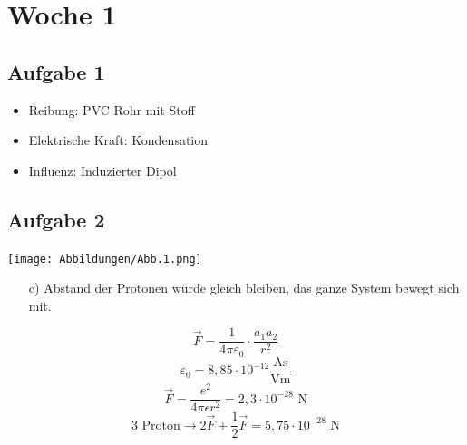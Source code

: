 \documentclass{article}
\begin{document}
\section*{Woche 1}
\subsection*{Aufgabe 1}
\begin{itemize}
    \item Reibung: PVC Rohr mit Stoff
    \item Elektrische Kraft: Kondensation
    \item Influenz: Induzierter Dipol
\end{itemize}
\subsection*{Aufgabe 2}
\begin{center}
    \texttt{[image: Abbildungen/Abb.1.png]}
\end{center}
\begin{itemize}
    \item[c)] Abstand der Protonen würde gleich bleiben, das ganze System bewegt sich mit.
\end{itemize}
\begin{equation*}
    \vec{F} = \frac{1}{4\pi \varepsilon_0}\cdot\frac{a_1a_2}{r^2}
\end{equation*}
\begin{equation*}
    \varepsilon_0 = 8,85 \cdot 10^{-12} \mathrm{\frac{As}{Vm}}
\end{equation*}
\begin{equation*}
    \vec{F}=\frac{e^2}{4\pi\epsilon r^2}=2,3\cdot 10^{-28} \text{ N}
\end{equation*}
\begin{equation*}
    \text{3 Proton} \rightarrow 2\vec{F}+\frac{1}{2}\vec{F}=5,75 \cdot 10^{-28} \text{ N}
\end{equation*}
\end{document}
